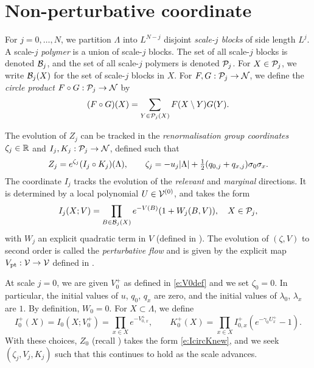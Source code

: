 
\section{Non-perturbative coordinate}
\label{sec:rgcoord}

For $j=0,\ldots, N$, we partition $\Lambda$ into $L^{N-j}$ disjoint
\emph{scale-$j$ blocks} of side length $L^j$.
A scale-$j$ \emph{polymer} is a union of scale-$j$ blocks.
The set of all scale-$j$ blocks is denoted $\mathcal{B}_j$, and
the set of all scale-$j$ polymers is denoted $\mathcal{P}_j$.
For $X \in \mathcal{P}_j$, we write $\mathcal{B}_j(X)$ for the set of scale-$j$ blocks in $X$.
For $F, G : \mathcal{P}_j \rightarrow \mathcal{N}$, we define the \emph{circle product} $F \circ G : \mathcal{P}_j \rightarrow \mathcal{N}$ by
\begin{equation}
(F \circ G)(X) = \sum_{Y\in\mathcal{P}_j(X)} F(X \setminus Y) G(Y).
\end{equation}

The evolution of $Z_j$ can be tracked in the \emph{renormalisation group coordinates}
$\zeta_j \in {\mathbb R}$ and
$I_j, K_j : \mathcal{P}_j \rightarrow \mathcal{N}$, defined such that
\begin{equation}
\label{e:IcircKnew}
	Z_j = e^{\zeta_j}(I_j\circ K_j)(\Lambda),
	\qquad
	\zeta_j= - u_j|\Lambda|
	+ \textstyle{\frac 12} (q_{0,j} + q_{x,j}) \sigma_0\sigma_x
	.
\end{equation}
The coordinate $I_j$ tracks the evolution of the
\emph{relevant} and \emph{marginal} directions.  It
is determined by a local polynomial
$U\in \mathcal{V}^{(0)}$,
and takes the form
\begin{equation}
I_j(X; V) = \prod_{B \in \mathcal{B}_j(X)} e^{-V(B)} (1 + W_j(B, V)), \quad X \in \mathcal{P}_j,
\end{equation}
with $W_j$ an explicit quadratic term in $V$ (defined in \cite[\eqref{pt-e:WLTF}]{BBS-rg-pt}).
The evolution of $(\zeta, V)$ to second order is called the \emph{perturbative flow} and is
given by the explicit map $V_{\rm pt} : \mathcal{V} \rightarrow \mathcal{V}$ defined in
\cite[\eqref{pt-e:Vptdef}]{BBS-rg-pt}.

At scale $j = 0$, we are given $V^+_0$ as defined in \eqref{e:V0def}
and we set $\zeta_0 = 0$. In particular,
the initial values of $u$, $q_0$, $q_x$ are zero, and the initial values of $\lambda_0$, $\lambda_x$
are $1$. By definition, $W_0 = 0$.
For $X \subset \Lambda$, we define
\begin{equation}
\label{e:IK0def}
I_0^+(X) = I_0(X; V^+_0) = \prod_{x\in X} e^{-V^+_{0,x}},
	\qquad
K_0^+(X) = \prod_{x \in X} I_{0,x}^+ (e^{-\gamma_0 U^{+}_{x}} - 1).
\end{equation}
With these choices, $Z_0$ (recall )
takes the form \eqref{e:IcircKnew}, and we seek $(\zeta_j, V_j, K_j)$ such that
this continues to hold as the scale advances.


